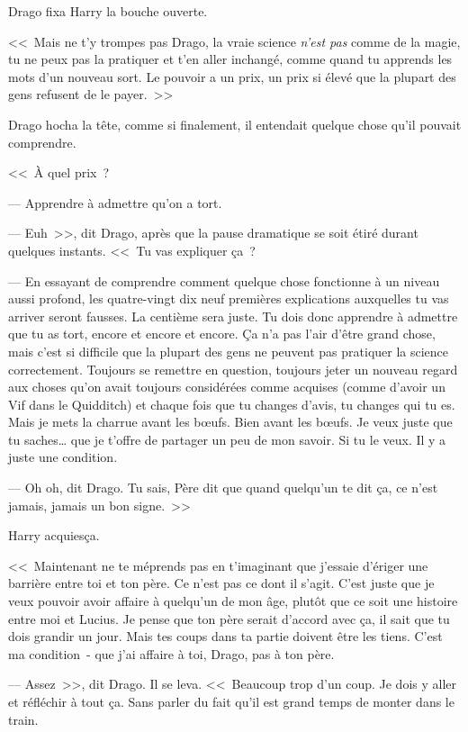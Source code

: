 Drago fixa Harry la bouche ouverte.

<<~Mais ne t'y trompes pas Drago, la vraie science \emph{n'est pas} comme de la magie, tu ne peux pas la pratiquer et t'en aller inchangé, comme quand tu apprends les mots d'un nouveau sort. Le pouvoir a un prix, un prix si élevé que la plupart des gens refusent de le payer.~>>

Drago hocha la tête, comme si finalement, il entendait quelque chose qu'il pouvait comprendre.

<<~À quel prix~?

--- Apprendre à admettre qu'on a tort.

--- Euh~>>, dit Drago, après que la pause dramatique se soit étiré durant quelques instants. <<~Tu vas expliquer ça~?

--- En essayant de comprendre comment quelque chose fonctionne à un niveau aussi profond, les quatre-vingt dix neuf premières explications auxquelles tu vas arriver seront fausses. La centième sera juste. Tu dois donc apprendre à admettre que tu as tort, encore et encore et encore. Ça n'a pas l'air d'être grand chose, mais c'est si difficile que la plupart des gens ne peuvent pas pratiquer la science correctement. Toujours se remettre en question, toujours jeter un nouveau regard aux choses qu'on avait toujours considérées comme acquises (comme d'avoir un Vif dans le Quidditch) et chaque fois que tu changes d'avis, tu changes qui tu es. Mais je mets la charrue avant les bœufs. Bien avant les bœufs. Je veux juste que tu saches… que je t'offre de partager un peu de mon savoir. Si tu le veux. Il y a juste une condition.

--- Oh oh, dit Drago. Tu sais, Père dit que quand quelqu'un te dit ça, ce n'est jamais, jamais un bon signe.~>>

Harry acquiesça.

<<~Maintenant ne te méprends pas en t'imaginant que j'essaie d'ériger une barrière entre toi et ton père. Ce n'est pas ce dont il s'agit. C'est juste que je veux pouvoir avoir affaire à quelqu'un de mon âge, plutôt que ce soit une histoire entre moi et Lucius. Je pense que ton père serait d'accord avec ça, il sait que tu dois grandir un jour. Mais tes coups dans ta partie doivent être les tiens. C'est ma condition~- que j'ai affaire à toi, Drago, pas à ton père.

--- Assez~>>, dit Drago. Il se leva. <<~Beaucoup trop d'un coup. Je dois y aller et réfléchir à tout ça. Sans parler du fait qu'il est grand temps de monter dans le train.

